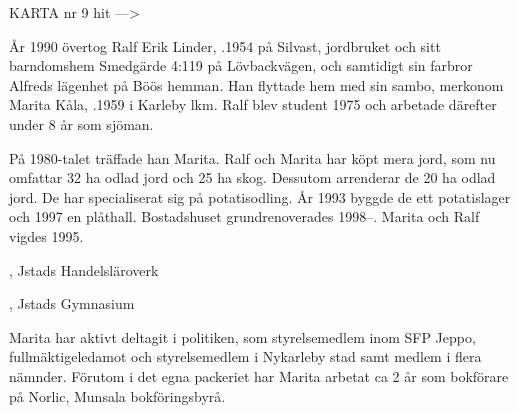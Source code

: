 
KARTA nr 9 hit --->





År 1990 övertog Ralf Erik Linder, .1954 på Silvast, jordbruket och sitt barndomshem Smedgärde 4:119 på Lövbackvägen, och samtidigt sin farbror Alfreds lägenhet på Böös hemman. Han flyttade hem med sin sambo, merkonom Marita Kåla, .1959 i Karleby lkm. Ralf blev student 1975 och arbetade därefter under 8 år som sjöman.

På 1980-talet träffade han Marita. Ralf och Marita har köpt mera jord, som nu omfattar 32 ha odlad jord och 25 ha skog. Dessutom arrenderar de 20 ha odlad jord. De har specialiserat sig på potatisodling. År 1993 byggde de ett potatislager och 1997 en plåthall. Bostadshuset grundrenoverades 1998--. Marita och Ralf vigdes 1995.
\begin{jhchildren}
  \item {}, Jstads Handelsläroverk
  \item {}, Jstads Gymnasium
\end{jhchildren}
Marita har aktivt deltagit i politiken, som styrelsemedlem inom SFP Jeppo, fullmäktigeledamot och styrelsemedlem i Nykarleby stad samt medlem i flera nämnder. Förutom i det egna packeriet har Marita arbetat ca 2 år som bokförare på Norlic, Munsala bokföringsbyrå.


